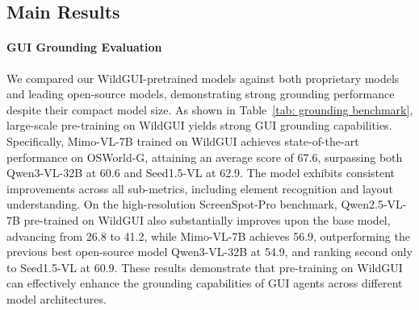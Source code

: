 \documentclass{article}
\theoremstyle{plain}
\theoremstyle{definition}
\theoremstyle{remark}
\begin{document}
\subsection{Main Results}

\paragraph{GUI Grounding Evaluation}


We compared our WildGUI-pretrained models against both proprietary models and leading open-source models, demonstrating strong grounding performance despite their compact model size.
As shown in Table~\ref{tab: grounding benchmark}, large-scale pre-training on WildGUI yields strong GUI grounding capabilities. Specifically, Mimo-VL-7B trained on WildGUI achieves state-of-the-art performance on OSWorld-G, attaining an average score of 67.6, surpassing both Qwen3-VL-32B at 60.6 and Seed1.5-VL at 62.9. The model exhibits consistent improvements across all sub-metrics, including element recognition and layout understanding.
On the high-resolution ScreenSpot-Pro benchmark, Qwen2.5-VL-7B pre-trained on WildGUI also substantially improves upon the base model, advancing from 26.8 to 41.2, while Mimo-VL-7B achieves 56.9, outperforming the previous best open-source model Qwen3-VL-32B at 54.9, and ranking second only to Seed1.5-VL at 60.9. These results demonstrate that pre-training on WildGUI can effectively enhance the grounding capabilities of GUI agents across different model architectures.
\end{document}
